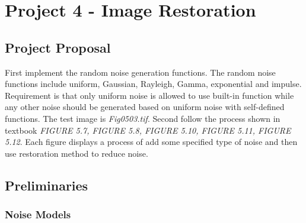 \section{Project 4 - Image Restoration}
\subsection{Project Proposal}
First implement the random noise generation functions. The random noise functions include uniform, Gaussian, Rayleigh, Gamma, exponential and impulse. Requirement is that only uniform noise is allowed to use built-in function while any other noise should be generated based on uniform noise with self-defined functions. The test image is \emph{Fig0503.tif}.
Second follow the process shown in textbook \emph{FIGURE 5.7, FIGURE 5.8, FIGURE 5.10, FIGURE 5.11, FIGURE 5.12}. Each figure displays a process of add some specified type of noise and then use restoration method to reduce noise.

\subsection{Preliminaries}




\subsubsection{Noise Models}



